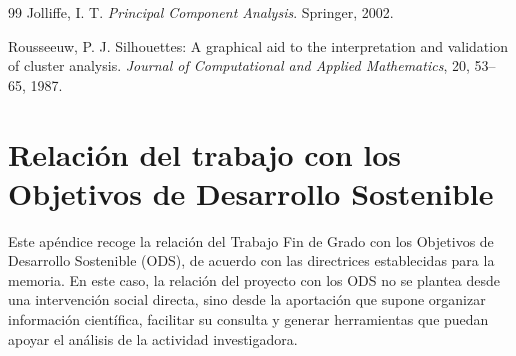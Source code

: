 \documentclass[11pt,spanish,listoffigures,listoftables]{tfgetsinf}
\begin{document}
\begin{thebibliography}{99}
Jolliffe, I. T.
\newblock \textit{Principal Component Analysis}.
\newblock Springer, 2002.

Rousseeuw, P. J.
\newblock Silhouettes: A graphical aid to the interpretation and validation of cluster analysis.
\newblock \textit{Journal of Computational and Applied Mathematics}, 20, 53--65, 1987.

%
%
%
%
%
%
%
%
%
%
%


\end{thebibliography}
\cleardoublepage



\APPENDIX


\chapter{Relación del trabajo con los Objetivos de Desarrollo Sostenible}

Este apéndice recoge la relación del Trabajo Fin de Grado con los Objetivos de Desarrollo Sostenible (ODS), de acuerdo con las directrices establecidas para la memoria. En este caso, la relación del proyecto con los ODS no se plantea desde una intervención social directa, sino desde la aportación que supone organizar información científica, facilitar su consulta y generar herramientas que puedan apoyar el análisis de la actividad investigadora.
\end{document}
